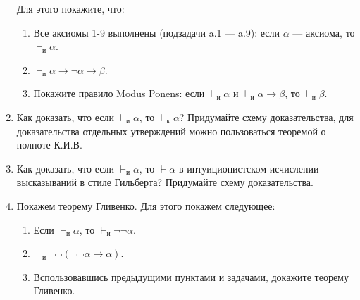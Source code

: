 \documentclass[10pt,a4paper,oneside]{article}
\begin{document}
\begin{enumerate}
Для этого покажите, что:
\begin{enumerate}
\item Все аксиомы 1-9 выполнены (подзадачи a.1 --- a.9): если $\alpha$ --- аксиома, то
$\vdash_\text{и}\alpha$.
\item $\vdash_\text{и}\alpha\rightarrow\neg\alpha\rightarrow\beta$.
\item Покажите правило Modus Ponens: если $\vdash_\text{и} \alpha$ и $\vdash_\text{и} \alpha\to\beta$,
то $\vdash_\text{и} \beta$.
\end{enumerate}

\item Как доказать, что если $\vdash_\text{и}\alpha$, то $\vdash_\text{к}\alpha$?
Придумайте схему доказательства, для доказательства отдельных утверждений можно пользоваться 
теоремой о полноте К.И.В.

\item Как доказать, что если $\vdash_\text{и}\alpha$, то $\vdash\alpha$ в интуиционистском исчислении высказываний
в стиле Гильберта? Придумайте схему доказательства.

\item Покажем теорему Гливенко. Для этого покажем следующее:

\begin{enumerate}
\item Если $\vdash_\text{и}\alpha$, то $\vdash_\text{и}\neg\neg\alpha$.
\item $\vdash_\text{и}\neg\neg(\neg\neg\alpha\to\alpha)$.
\item Вспользовавшись предыдущими пунктами и задачами, докажите теорему Гливенко.
\end{enumerate}
\end{enumerate}
\end{document}
